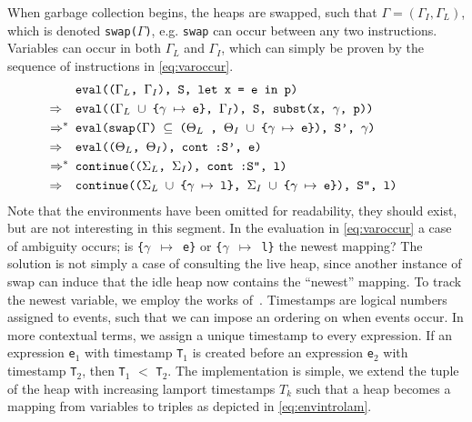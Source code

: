When garbage collection begins, the heaps are swapped, such that $\Gamma = (\Gamma_I, \Gamma_L)$, which is denoted \texttt{swap($\Gamma$)}, e.g. \texttt{swap} can occur between any two instructions.
Variables can occur in both $\Gamma_L$ and $\Gamma_I$, which can simply be proven by the sequence of instructions in \autoref{eq:varoccur}.
\begin{align}
	                            & \texttt{ eval(($\Gamma_L$, $\Gamma_I$), S, let x = e in p)} \label{eq:varoccur}                                           \\
	\Rightarrow\hspace*{0.18cm} & \texttt{ eval(($\Gamma_L$ $\cup$ \{$\gamma$ $\mapsto$ e\}, $\Gamma_I$), S, subst(x, $\gamma$, p))}\tag*{}                 \\
	\Rightarrow^*               & \texttt{ eval(swap($\Gamma$) $\subseteq$ ($\Theta_L$ , $\Theta_I$ $\cup$ \{$\gamma$ $\mapsto$ e\}), S', $\gamma$)}\tag*{} \\
	\Rightarrow\hspace*{0.18cm} & \texttt{ eval(($\Theta_L$, $\Theta_I$), cont :S', e)}\tag*{}                                                              \\
	\Rightarrow^*               & \texttt{ continue(($\Sigma_L$, $\Sigma_I$), cont :S'', l)}\tag*{}                                                         \\
	\Rightarrow\hspace*{0.18cm} & \texttt{ continue(($\Sigma_L$ $\cup$ \{$\gamma$ $\mapsto$ l\}, $\Sigma_I$ $\cup$ \{$\gamma$ $\mapsto$ e\}), S'', l)}\tag*{}
\end{align}
Note that the environments have been omitted for readability, they should exist, but are not interesting in this segment.
In the evaluation in \autoref{eq:varoccur} a case of ambiguity occurs; is \texttt{\{$\gamma$ $\mapsto$ e\}} or \texttt{\{$\gamma$ $\mapsto$ l\}} the newest mapping?
The solution is not simply a case of consulting the live heap, since another instance of swap can induce that the idle heap now contains the ``newest'' mapping.
To track the newest variable, we employ the works of~\cite{lamport}.
Timestamps are logical numbers assigned to events, such that we can impose an ordering on when events occur.
In more contextual terms, we assign a unique timestamp to every expression.
If an expression \texttt{e}$_1$ with timestamp \texttt{T}$_1$ is created before an expression \texttt{e}$_2$ with timestamp \texttt{T}$_2$, then \texttt{T}$_1$ $<$ \texttt{T}$_2$.
The implementation is simple, we extend the tuple of the heap with increasing lamport timestamps $T_k$ such that a heap becomes a mapping from variables to triples as depicted in \autoref{eq:envintrolam}.

